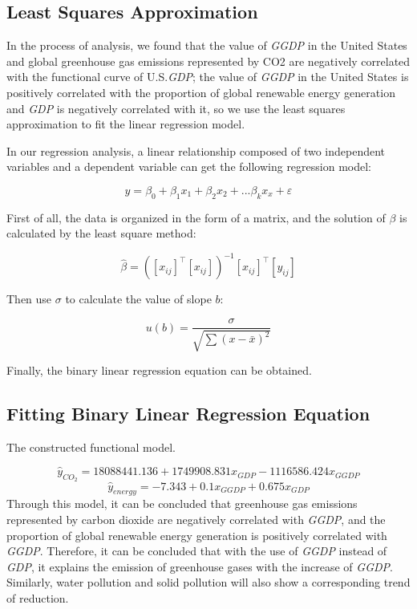 \documentclass[12pt]{article}
\begin{document}
	
	\subsection{Least Squares Approximation} %
	In the process of analysis, we found that the value of \textit{GGDP} in the United States and global greenhouse gas emissions represented by CO2 are negatively correlated with the functional curve of U.S.\textit{GDP}; the value of \textit{GGDP} in the United States is positively correlated with the proportion of global renewable energy generation and \textit{GDP} is negatively correlated with it, so we use the least squares approximation to fit the linear regression model.
	
	In our regression analysis, a linear relationship composed of two independent variables and a dependent variable can get the following regression model:
	
	\begin{equation}\label{}
		y=\beta _{0}+\beta _{1}x_{1}+\beta_{2}x_{2}+...\beta_{k}x_{x}+\varepsilon
	\end{equation}
	
	First of all, the data is organized in the form of a matrix, and the solution of $\beta$ is calculated by the least square method:
	
	\begin{equation}\label{}
		\hat{\beta } =(\left [ x_{ij} \right ]^{\top } \left [ x_{ij} \right ] )^{-1}\left [ x_{ij} \right ] ^{\top}\left [ y_{ij} \right ]
	\end{equation}
	
	Then use $\sigma$ to calculate the value of slope $b$:
	
	\begin{equation}\label{}
		u(b)=\frac{\sigma }{\sqrt{\sum (x-\bar{x} )^{2}} }
	\end{equation}
	
	Finally, the binary linear regression equation can be obtained. 
	
	\subsection{Fitting Binary Linear Regression Equation} %
	The constructed functional model.
	
	\begin{equation}\label{}
		\hat{y}_{CO_{2}} = 18088441.136 + 1749908.831x_{GDP}-1116586.424x_{GGDP}
	\end{equation}
	\begin{equation}\label{}
		\hat{y}_{energy}  =-7 .343 + 0.1x_{GGDP}+0.675x_{GDP}
	\end{equation}
	Through this model, it can be concluded that greenhouse gas emissions represented by carbon dioxide are negatively correlated with \textit{GGDP}, and the proportion of global renewable energy generation is positively correlated with \textit{GGDP}.
	Therefore, it can be concluded that with the use of \textit{GGDP} instead of \textit{GDP}, it explains the emission of greenhouse gases with the increase of \textit{GGDP}.
	Similarly, water pollution and solid pollution will also show a corresponding trend of reduction.
	
\end{document}
